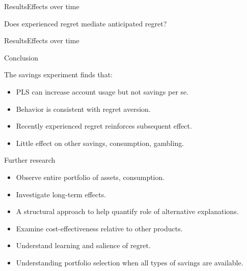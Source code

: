 \documentclass[aspectratio=169]{beamer}
\newenvironment{wideitemize}{\itemize\addtolength{\itemsep}{10pt}}{\enditemize}
\begin{document}
\begin{frame}{Results}{Effects over time}

	\centering \large Does experienced regret mediate anticipated regret?

\end{frame}

\begin{frame}{Results}{Effects over time}
	
	

\end{frame}



\begin{frame}{Conclusion}

	\begin{wideitemize}
		\item The savings experiment finds that:
		\begin{itemize}
			\item PLS can increase account usage but not savings per se.
			\item Behavior is consistent with regret aversion.
			\item Recently experienced regret reinforces subsequent effect.
			\item Little effect on other savings, consumption, gambling.
		\end{itemize}
		\item Further research
		\begin{itemize}
			\item Observe entire portfolio of assets, consumption.
			\item Investigate long-term effects.
			\item A structural approach to help quantify role of alternative explanations.
			\item Examine cost-effectiveness relative to other products.
			\item Understand learning and salience of regret.
			\item Understanding portfolio selection when all types of savings are available.
		\end{itemize}
	\end{wideitemize}

\end{frame}
\end{document}
